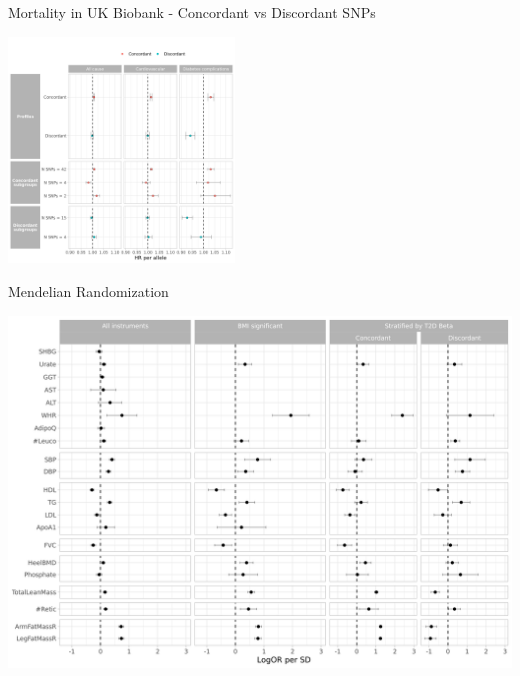 \documentclass[presentation]{beamer}
\begin{document}
\begin{frame}[label={sec:orgaa8bc50}]{Mortality in UK Biobank - Concordant vs Discordant SNPs}
\begin{center}
\includegraphics[width=6cm]{./plots/prs_surv.png}
\end{center}
\end{frame}

\begin{frame}[label={sec:org1437c0a}]{Mendelian Randomization}
\begin{center}
\includegraphics[width=.9\linewidth]{./plots/mr_res.png}
\end{center}
\end{frame}
\end{document}
